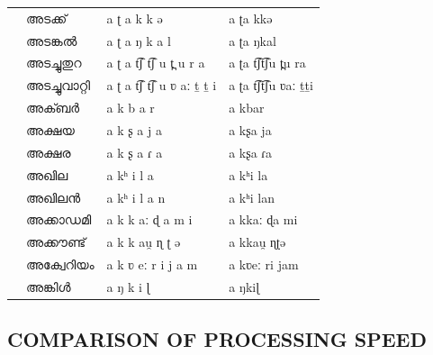 \documentclass{ieeeaccess}
\begin{document}
\begin{table}[!h]
\begin{center}
\begin{minipage}{\textwidth}
\begin{tabular}{@{}p{1.2cm}p{1.5cm}p{2cm}p{2.2cm}@{}}
				\hline
				\multirow{4}{*}{\rotatebox{60}{Nouns}}          & {\mal അടക്ക്}       & {\ipa a ʈ a k k ə}                & {\ipa a ʈa kkə}            \\
				                                & {\mal അടങ്കൽ}      & {\ipa a ʈ a ŋ k a l}              & {\ipa a ʈa ŋkal}           \\
				                                & {\mal അടച്ചുതുറ}     & {\ipa a ʈ a t͡ʃ t͡ʃ u t̪ u r a}      & {\ipa a ʈa t͡ʃt͡ʃu t̪u ra}    \\
				                                & {\mal അടച്ചുവാറ്റി}  & {\ipa a ʈ a t͡ʃ t͡ʃ u ʋ aː ṯ ṯ i}   & {\ipa a ʈa t͡ʃt͡ʃu ʋaː ṯṯi}  \\
				\hline
				\multirow{4}{*}{\rotatebox{60}{Proper Nouns}}  & {\mal അക്ബർ}       & {\ipa a k b a r}                  & {\ipa a kbar}              \\
				                                & {\mal അക്ഷയ}       & {\ipa a k ʂ a j a}                & {\ipa a kʂa ja}            \\
				                                & {\mal അക്ഷര}       & {\ipa a k ʂ a ɾ a}                & {\ipa a kʂa ɾa}            \\
				                                & {\mal അഖില}       & {\ipa a kʰ i l a}                 & {\ipa a kʰi la}            \\
				                                				                                & {\mal അഖിലൻ}      & {\ipa a kʰ i l a n}                 & {\ipa a kʰi lan}            \\
				\hline
				\multirow{4}{*}{\rotatebox{60}{Loan words}} & {\mal അക്കാഡമി}    & {\ipa a k k aː ɖ a m i}           & {\ipa a kkaː ɖa mi}        \\
				                                & {\mal അക്കൗണ്ട്}     & {\ipa a k k au̯ ɳ ʈ ə}             & {\ipa a kkau̯ ɳʈə}          \\
				                                & {\mal അക്വേറിയം}   & {\ipa a k ʋ eː r i j a m}         & {\ipa a kʋeː ri jam}       \\
				                                & {\mal അങ്കിൾ}      & {\ipa a ŋ k i ɭ}                  & {\ipa a ŋkiɭ}              \\
				\hline
			\end{tabular}
		\end{minipage}
	\end{center}
\end{table}


\subsection{COMPARISON OF PROCESSING SPEED}
\end{document}
